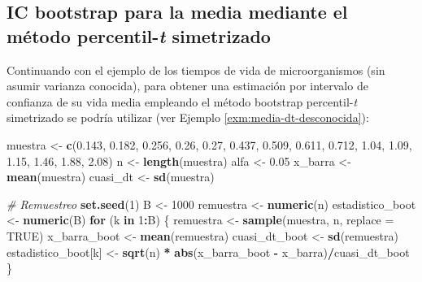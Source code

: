 \documentclass[
]{book}
\newenvironment{Shaded}{\begin{snugshade}}{\end{snugshade}}
\newcommand{\CommentTok}[1]{\textcolor[rgb]{0.56,0.35,0.01}{\textit{#1}}}
\newcommand{\ControlFlowTok}[1]{\textcolor[rgb]{0.13,0.29,0.53}{\textbf{#1}}}
\newcommand{\DataTypeTok}[1]{\textcolor[rgb]{0.13,0.29,0.53}{#1}}
\newcommand{\DecValTok}[1]{\textcolor[rgb]{0.00,0.00,0.81}{#1}}
\newcommand{\FloatTok}[1]{\textcolor[rgb]{0.00,0.00,0.81}{#1}}
\newcommand{\KeywordTok}[1]{\textcolor[rgb]{0.13,0.29,0.53}{\textbf{#1}}}
\newcommand{\NormalTok}[1]{#1}
\newcommand{\OperatorTok}[1]{\textcolor[rgb]{0.81,0.36,0.00}{\textbf{#1}}}
\newcommand{\OtherTok}[1]{\textcolor[rgb]{0.56,0.35,0.01}{#1}}
\newcommand{\StringTok}[1]{\textcolor[rgb]{0.31,0.60,0.02}{#1}}
\theoremstyle{break}
\theoremstyle{definition}
\theoremstyle{definition}
\theoremstyle{definition}
\theoremstyle{remark}
\begin{document}
\hypertarget{media-dt-desconocida-persim}{%
\subsection{\texorpdfstring{IC bootstrap para la media mediante el método percentil-\emph{t} simetrizado}{IC bootstrap para la media mediante el método percentil-t simetrizado}}\label{media-dt-desconocida-persim}}

Continuando con el ejemplo de los tiempos de vida de microorganismos
(sin asumir varianza conocida),
para obtener una estimación por intervalo de confianza
de su vida media empleando el método bootstrap percentil-\emph{t} simetrizado
se podría utilizar (ver Ejemplo \ref{exm:media-dt-desconocida}):

\begin{Shaded}
\begin{Highlighting}[]
\NormalTok{muestra <-}\StringTok{ }\KeywordTok{c}\NormalTok{(}\FloatTok{0.143}\NormalTok{, }\FloatTok{0.182}\NormalTok{, }\FloatTok{0.256}\NormalTok{, }\FloatTok{0.26}\NormalTok{, }\FloatTok{0.27}\NormalTok{, }\FloatTok{0.437}\NormalTok{, }\FloatTok{0.509}\NormalTok{, }
             \FloatTok{0.611}\NormalTok{, }\FloatTok{0.712}\NormalTok{, }\FloatTok{1.04}\NormalTok{, }\FloatTok{1.09}\NormalTok{, }\FloatTok{1.15}\NormalTok{, }\FloatTok{1.46}\NormalTok{, }\FloatTok{1.88}\NormalTok{, }\FloatTok{2.08}\NormalTok{)}
\NormalTok{n <-}\StringTok{ }\KeywordTok{length}\NormalTok{(muestra)}
\NormalTok{alfa <-}\StringTok{ }\FloatTok{0.05}
\NormalTok{x_barra <-}\StringTok{ }\KeywordTok{mean}\NormalTok{(muestra)}
\NormalTok{cuasi_dt <-}\StringTok{ }\KeywordTok{sd}\NormalTok{(muestra)}

\CommentTok{# Remuestreo}
\KeywordTok{set.seed}\NormalTok{(}\DecValTok{1}\NormalTok{)}
\NormalTok{B <-}\StringTok{ }\DecValTok{1000}
\NormalTok{remuestra <-}\StringTok{ }\KeywordTok{numeric}\NormalTok{(n)}
\NormalTok{estadistico_boot <-}\StringTok{ }\KeywordTok{numeric}\NormalTok{(B)}
\ControlFlowTok{for}\NormalTok{ (k }\ControlFlowTok{in} \DecValTok{1}\OperatorTok{:}\NormalTok{B) \{}
\NormalTok{  remuestra <-}\StringTok{ }\KeywordTok{sample}\NormalTok{(muestra, n, }\DataTypeTok{replace =} \OtherTok{TRUE}\NormalTok{)}
\NormalTok{  x_barra_boot <-}\StringTok{ }\KeywordTok{mean}\NormalTok{(remuestra)}
\NormalTok{  cuasi_dt_boot <-}\StringTok{ }\KeywordTok{sd}\NormalTok{(remuestra)}
\NormalTok{  estadistico_boot[k] <-}\StringTok{ }\KeywordTok{sqrt}\NormalTok{(n) }\OperatorTok{*}\StringTok{ }\KeywordTok{abs}\NormalTok{(x_barra_boot }\OperatorTok{-}\StringTok{ }\NormalTok{x_barra)}\OperatorTok{/}\NormalTok{cuasi_dt_boot}
\NormalTok{\}}


\end{Highlighting}
\end{Shaded}
\end{document}

